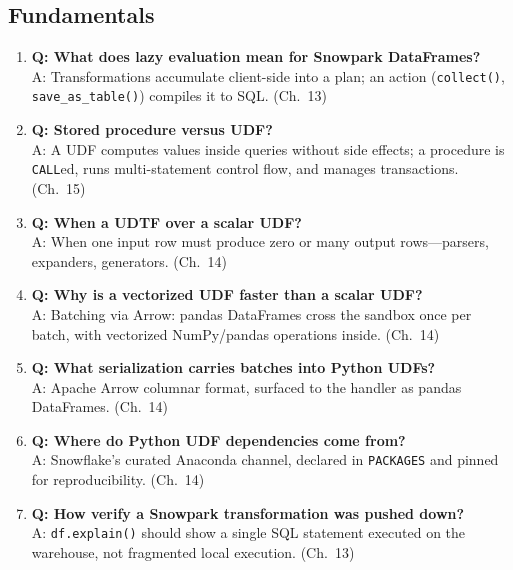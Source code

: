 \subsection{Fundamentals}
\begin{enumerate}
    \item \textbf{Q: What does lazy evaluation mean for Snowpark DataFrames?}\\
    A: Transformations accumulate client-side into a plan; an action (\texttt{collect()}, \texttt{save\_as\_table()}) compiles it to SQL. (Ch.~13)
    \item \textbf{Q: Stored procedure versus UDF?}\\
    A: A UDF computes values inside queries without side effects; a procedure is \texttt{CALL}ed, runs multi-statement control flow, and manages transactions. (Ch.~15)
    \item \textbf{Q: When a UDTF over a scalar UDF?}\\
    A: When one input row must produce zero or many output rows---parsers, expanders, generators. (Ch.~14)
    \item \textbf{Q: Why is a vectorized UDF faster than a scalar UDF?}\\
    A: Batching via Arrow: pandas DataFrames cross the sandbox once per batch, with vectorized NumPy/pandas operations inside. (Ch.~14)
    \item \textbf{Q: What serialization carries batches into Python UDFs?}\\
    A: Apache Arrow columnar format, surfaced to the handler as pandas DataFrames. (Ch.~14)
    \item \textbf{Q: Where do Python UDF dependencies come from?}\\
    A: Snowflake's curated Anaconda channel, declared in \texttt{PACKAGES} and pinned for reproducibility. (Ch.~14)
    \item \textbf{Q: How verify a Snowpark transformation was pushed down?}\\
    A: \texttt{df.explain()} should show a single SQL statement executed on the warehouse, not fragmented local execution. (Ch.~13)
\end{enumerate}

